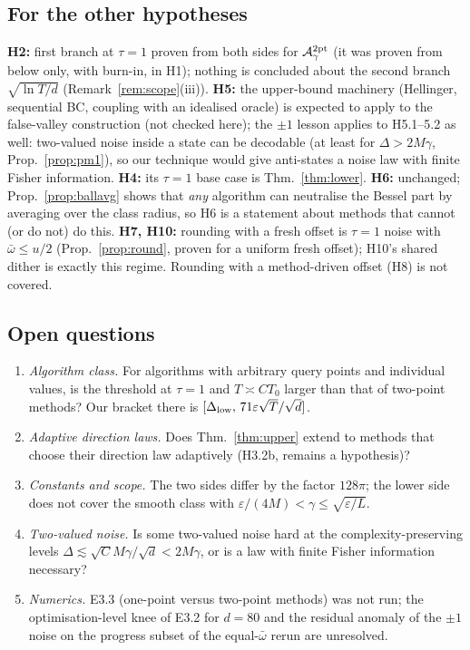 \documentclass[11pt,a4paper]{article}
\numberwithin{equation}{section}
\theoremstyle{definition}
\theoremstyle{remark}
\newcommand{\wbar}{\bar\omega}\newcommand{\Atwo}{\cA^{\rm 2pt}_\gamma}
\begin{document}
\subsection{For the other hypotheses}
\textbf{H2:} first branch at $\tau=1$ proven from both sides for $\Atwo$ (it was proven from below only, with burn-in, in H1); nothing is concluded about the second branch $\sqrt{\ln T/d}$ (Remark~\ref{rem:scope}(iii)). \textbf{H5:} the upper-bound machinery (Hellinger, sequential BC, coupling with an idealised oracle) is expected to apply to the false-valley construction (not checked here); the $\pm1$ lesson applies to H5.1--5.2 as well: two-valued noise inside a state can be decodable (at least for $\Delta>2M\gamma$, Prop.~\ref{prop:pm1}), so our technique would give anti-states a noise law with finite Fisher information. \textbf{H4:} its $\tau=1$ base case is Thm.~\ref{thm:lower}. \textbf{H6:} unchanged; Prop.~\ref{prop:ballavg} shows that \emph{any} algorithm can neutralise the Bessel part by averaging over the class radius, so H6 is a statement about methods that cannot (or do not) do this. \textbf{H7, H10:} rounding with a fresh offset is $\tau=1$ noise with $\wbar\le u/2$ (Prop.~\ref{prop:round}, proven for a uniform fresh offset); H10's shared dither is exactly this regime. Rounding with a method-driven offset (H8) is not covered.

\subsection{Open questions}
\begin{enumerate}
\item \emph{Algorithm class.} For algorithms with arbitrary query points and individual values, is the threshold at $\tau=1$ and $T\asymp CT_0$ larger than that of two-point methods? Our bracket there is $[\Delta_{\rm low},\,71\varepsilon\sqrt T/\sqrt d]$.
\item \emph{Adaptive direction laws.} Does Thm.~\ref{thm:upper} extend to methods that choose their direction law adaptively (H3.2b, remains a hypothesis)?
\item \emph{Constants and scope.} The two sides differ by the factor $128\pi$; the lower side does not cover the smooth class with $\varepsilon/(4M)<\gamma\le\sqrt{\varepsilon/L}$.
\item \emph{Two-valued noise.} Is some two-valued noise hard at the complexity-preserving levels $\Delta\lesssim\sqrt C M\gamma/\sqrt d<2M\gamma$, or is a law with finite Fisher information necessary?
\item \emph{Numerics.} E3.3 (one-point versus two-point methods) was not run; the optimisation-level knee of E3.2 for $d=80$ and the residual anomaly of the $\pm1$ noise on the progress subset of the equal-$\wbar$ rerun are unresolved.
\end{enumerate}
\end{document}
